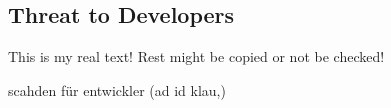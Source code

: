 \subsection{Threat to Developers} \label{subsection:foundation-piracy-developers}
This is my real text! Rest might be copied or not be checked!


scahden für entwickler (ad id klau,)\newline
